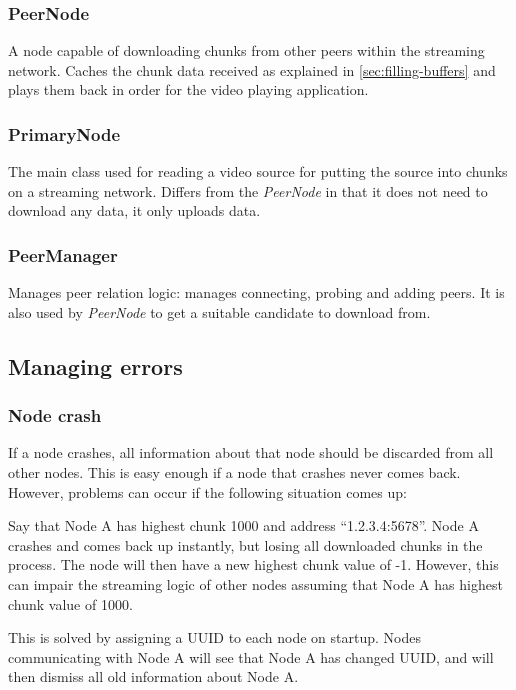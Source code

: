 \documentclass[10pt, a4paper]{article}
\begin{document}
\subsubsection*{PeerNode}

A node capable of downloading chunks from other peers within the streaming
network. Caches the chunk data received as explained in
\autoref{sec:filling-buffers} and plays them back in order for the video playing
application.

\subsubsection*{PrimaryNode}

The main class used for reading a video source for putting the source into
chunks on a streaming network. Differs from the \emph{PeerNode} in that it does
not need to download any data, it only uploads data.

\subsubsection*{PeerManager}

Manages peer relation logic: manages connecting, probing and adding peers. It is
also used by \emph{PeerNode} to get a suitable candidate to download from.

\subsection{Managing errors}

\subsubsection{Node crash}

If a node crashes, all information about that node should be discarded from all
other nodes. This is easy enough if a node that crashes never comes
back. However, problems can occur if the following situation comes up:

Say that Node A has highest chunk 1000 and address ``1.2.3.4:5678''. Node A
crashes and comes back up instantly, but losing all downloaded chunks in the
process. The node will then have a new highest chunk value of -1. However, this
can impair the streaming logic of other nodes assuming that Node A has highest
chunk value of 1000.

This is solved by assigning a UUID to each node on startup. Nodes communicating
with Node A will see that Node A has changed UUID, and will then dismiss all old
information about Node A.
\end{document}
